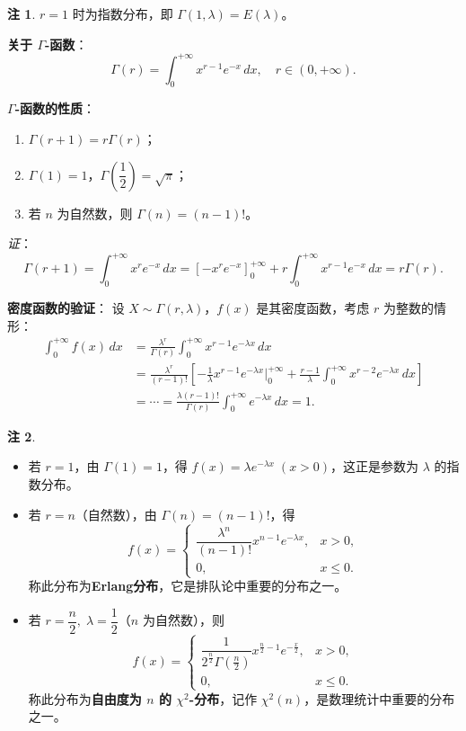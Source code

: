 \documentclass[11pt,a4paper]{report}
\theoremstyle{definition}
\newtheorem{note}{注}[chapter]
\begin{document}
\begin{note}
$r=1$ 时为指数分布，即 $\Gamma(1,\lambda) = E(\lambda)$。
\end{note}

\textbf{关于 $\Gamma$-函数}：
\[
\Gamma(r) = \int_0^{+\infty}x^{r-1}e^{-x}\,dx, \quad r \in (0,+\infty).
\]

\textbf{$\Gamma$-函数的性质}：
\begin{enumerate}[leftmargin=2em]
    \item $\Gamma(r+1) = r\Gamma(r)$；
    \item $\Gamma(1)=1$，$\Gamma\left(\dfrac{1}{2}\right)=\sqrt{\pi}$；
    \item 若 $n$ 为自然数，则 $\Gamma(n)=(n-1)!$。
\end{enumerate}

\textit{证}：
\[
\Gamma(r+1) = \int_0^{+\infty}x^r e^{-x}\,dx = \left[-x^r e^{-x}\right]_0^{+\infty} + r\int_0^{+\infty}x^{r-1}e^{-x}\,dx = r\Gamma(r).
\]

\textbf{密度函数的验证}：
设 $X \sim \Gamma(r,\lambda)$，$f(x)$ 是其密度函数，考虑 $r$ 为整数的情形：
\begin{align*}
\int_0^{+\infty}f(x)\,dx &= \frac{\lambda^r}{\Gamma(r)}\int_0^{+\infty}x^{r-1}e^{-\lambda x}\,dx \\
&= \frac{\lambda^r}{(r-1)!}\left[-\frac{1}{\lambda}x^{r-1}e^{-\lambda x}\Big|_0^{+\infty} + \frac{r-1}{\lambda}\int_0^{+\infty}x^{r-2}e^{-\lambda x}\,dx\right] \\
&= \cdots = \frac{\lambda(r-1)!}{\Gamma(r)}\int_0^{+\infty}e^{-\lambda x}\,dx = 1.
\end{align*}

\begin{note}
\begin{itemize}[leftmargin=2em]
    \item 若 $r=1$，由 $\Gamma(1)=1$，得 $f(x)=\lambda e^{-\lambda x}\;(x>0)$，这正是参数为 $\lambda$ 的指数分布。
    \item 若 $r=n$（自然数），由 $\Gamma(n)=(n-1)!$，得
    \[
    f(x) = \begin{cases} \dfrac{\lambda^n}{(n-1)!}x^{n-1}e^{-\lambda x}, & x>0, \\ 0, & x \leq 0. \end{cases}
    \]
    称此分布为\textbf{Erlang分布}，它是排队论中重要的分布之一。
    \item 若 $r=\dfrac{n}{2},\; \lambda=\dfrac{1}{2}$（$n$ 为自然数），则
    \[
    f(x) = \begin{cases} \dfrac{1}{2^{\frac{n}{2}}\Gamma\left(\frac{n}{2}\right)}x^{\frac{n}{2}-1}e^{-\frac{x}{2}}, & x>0, \\ 0, & x \leq 0. \end{cases}
    \]
    称此分布为\textbf{自由度为 $n$ 的 $\chi^2$-分布}，记作 $\chi^2(n)$，是数理统计中重要的分布之一。
\end{itemize}
\end{note}
\end{document}
